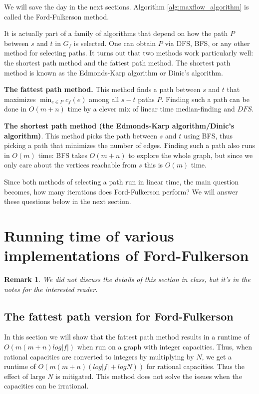 \documentclass [12pt]{article}
\newtheorem{remark}{Remark}
\theoremstyle{definition}
\begin{document}
We will save the day in the next sections. Algorithm \ref{alg:maxflow_algorithm} is called the Ford-Fulkerson method.

It is actually part of a family of algorithms that depend on how the path $P$ between $s$ and $t$ in $G_f$ is selected. One can obtain $P$ via DFS, BFS, or any other method for selecting paths. It turns out that two methods work particularly well: the shortest path method and the fattest path method. The shortest path method is known as the Edmonds-Karp algorithm or Dinic's algorithm. 

\textbf{The fattest path method.} This method finds a path between $s$ and $t$ that maximizes $\min_{e \in P} c_f (e)$ among all $s-t$ paths $P$. Finding such a path can be done in $O(m + n)$ time by a clever mix of linear time median-finding and $DFS$. 


\textbf{The shortest path method (the Edmonds-Karp algorithm/Dinic's algorithm)}. This method picks the path between $s$ and $t$ using BFS, thus picking a path that minimizes the number of edges. Finding such a path also runs in $O(m)$ time: BFS takes $O(m + n)$ to explore the whole graph, but since we only care about the vertices reachable from $s$ this is $O(m)$ time. 

Since both methods of selecting a path run in linear time, the main question becomes, how many iterations does Ford-Fulkerson perform? We will answer these questions below in the next section.

\section{Running time of various implementations of Ford-Fulkerson}
\begin{remark}
We did not discuss the details of this section in class, but it's in the notes for the interested reader.
\end{remark}

\subsection{The fattest path version for Ford-Fulkerson} 

In this section we will show that the fattest path method results in a runtime of $O(m(m + n) log |f |)$ when run on a graph with integer capacities. Thus, when rational capacities are converted to integers by multiplying by $N$, we get a runtime of $O(m(m + n)(log |f | + log N))$ for rational capacities. Thus the effect of large $N$ is mitigated. This method does not solve the issues when the capacities can be irrational. 
\end{document}
